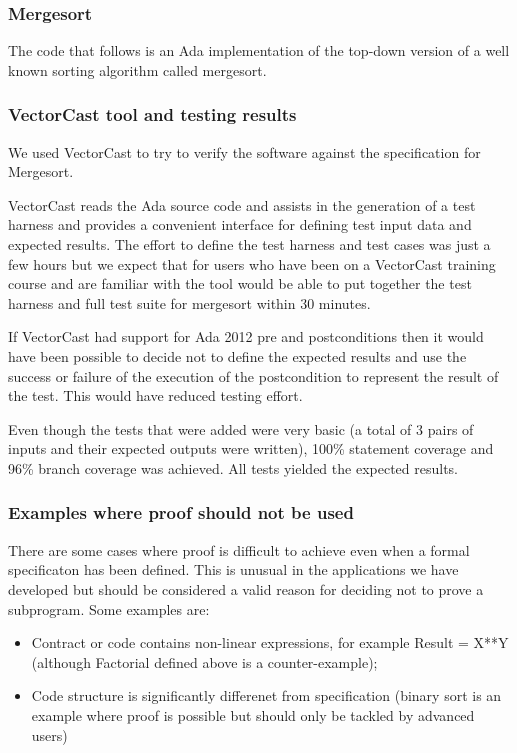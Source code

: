 \documentclass{llncs}
\newcommand{\vectorcast}{VectorCast\xspace}
\begin{document}
\subsubsection{Mergesort}
The code that follows is an Ada implementation of the top-down version
of a well known sorting algorithm called mergesort.



\subsubsection{\vectorcast tool and testing results}
We used \vectorcast to try to verify the software against the
specification for Mergesort.

\vectorcast reads the Ada source code and assists in the generation of
a test harness and provides a convenient interface for defining test
input data and expected results. The effort to define the test
harness and test cases was just a few hours but we expect that for
users who have been on a \vectorcast training course and are familiar
with the tool would be able to put together the test harness and full
test suite for mergesort within 30 minutes.

If \vectorcast had support for Ada 2012 pre and postconditions then it
would have been possible to decide not to define the expected results
and use the success or failure of the execution of the postcondition
to represent the result of the test. This would have reduced testing
effort.

Even though the tests that were added were very basic (a total of 3
pairs of inputs and their expected outputs were written), 100\%
statement coverage and 96\% branch coverage was achieved. All tests
yielded the expected results.

\subsubsection{Examples where proof should not be used}
There are some cases where proof is difficult to achieve even when a
formal specificaton has been defined. This is unusual in the
applications we have developed but should be considered a valid reason
for deciding not to prove a subprogram. Some examples are:

\begin{itemize}
\item Contract or code contains non-linear expressions, for example
  Result = X**Y (although Factorial defined above is a
  counter-example);
\item Code structure is significantly differenet from specification
  (binary sort is an example where proof is possible but should only
  be tackled by advanced users)
\end{itemize}
\end{document}
